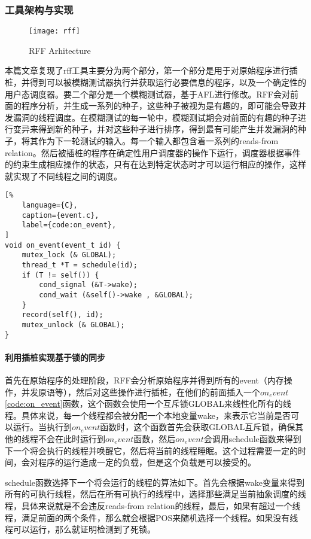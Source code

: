 \subsubsection{工具架构与实现}

\begin{figure}[ht]
    \centering
    \texttt{[image: rff]}
    \caption{\label{fig:rff}RFF Arhitecture}
\end{figure}

本篇文章复现了rff工具主要分为两个部分，第一个部分是用于对原始程序进行插桩，并得到可以被模糊测试器执行并获取运行必要信息的程序，以及一个确定性的用户态调度器。要二个部分是一个模糊测试器，基于AFL进行修改。RFF会对前面的程序分析，并生成一系列的种子，这些种子被视为是有趣的，即可能会导致并发漏洞的线程调度。在模糊测试的每一轮中，模糊测试期会对前面的有趣的种子进行变异来得到新的种子，并对这些种子进行排序，得到最有可能产生并发漏洞的种子，将其作为下一轮测试的输入。每一个输入都包含着一系列的reads-from relation。然后被插桩的程序在确定性用户调度器的操作下运行，调度器根据事件的约束生成相应操作的状态，只有在达到特定状态时才可以运行相应的操作，这样就实现了不同线程之间的调度。

\begin{spacing}{1.0}
\begin{lstlisting}[%
    language={C},
    caption={event.c},
    label={code:on_event},
]
void on_event(event_t id) {
    mutex_lock (& GLOBAL);
    thread_t *T = schedule(id);
    if (T != self()) {
        cond_signal (&T->wake);
        cond_wait (&self()->wake , &GLOBAL);
    }
    record(self(), id);
    mutex_unlock (& GLOBAL);
}
\end{lstlisting}
\end{spacing}

\paragraph{利用插桩实现基于锁的同步}首先在原始程序的处理阶段，RFF会分析原始程序并得到所有的event（内存操作，并发原语等），然后对这些操作进行插桩，在他们的前面插入一个$on_event$\autoref{code:on_event}函数，这个函数会使用一个互斥锁GLOBAL来线性化所有的线程。具体来说，每一个线程都会被分配一个本地变量wake，来表示它当前是否可以运行。当执行到$on_event$函数时，这个函数首先会获取GLOBAL互斥锁，确保其他的线程不会在此时运行到$on_event$函数，然后$on_event$会调用schedule函数来得到下一个将会执行的线程并唤醒它，然后将当前的线程睡眠。这个过程需要一定的时间，会对程序的运行造成一定的负载，但是这个负载是可以接受的。

schedule函数选择下一个将会运行的线程的算法如下。首先会根据wake变量来得到所有的可执行线程，然后在所有可执行的线程中，选择那些满足当前抽象调度的线程，具体来说就是不会违反reads-from relation的线程，最后，如果有超过一个线程，满足前面的两个条件，那么就会根据POS来随机选择一个线程。如果没有线程可以运行，那么就证明检测到了死锁。



